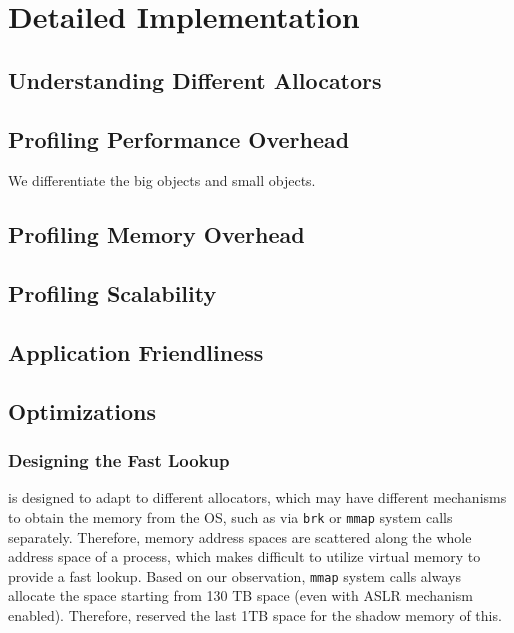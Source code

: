 \section{Detailed Implementation}

\label{sec:implement}





\subsection{Understanding Different Allocators}

\label{sec:understandingallocators}


\subsection{Profiling Performance Overhead}

We differentiate the big objects and small objects. 

\subsection{Profiling Memory Overhead}

\subsection{Profiling Scalability}

\subsection{Application Friendliness}

\subsection{Optimizations}

\subsubsection{Designing the Fast Lookup}

\label{sec:fastlookup}

\MP{} is designed to adapt to different allocators, which may have different mechanisms to obtain the memory from the OS, such as via \texttt{brk} or \texttt{mmap} system calls separately. Therefore, memory address spaces are scattered along the whole address space of a process, which makes difficult to utilize virtual memory to provide a fast lookup. Based on our observation, \texttt{mmap} system calls always allocate the space starting from 130 TB space (even with ASLR mechanism enabled). Therefore, \MP{} reserved the last 1TB space for the shadow memory of this.   
